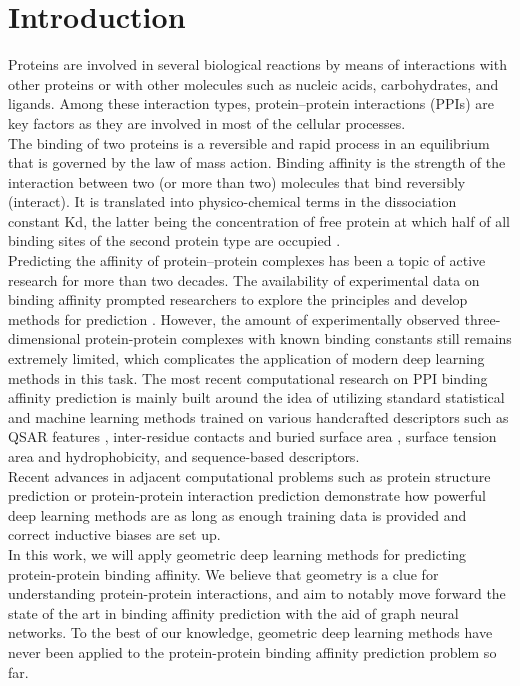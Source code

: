 \section{Introduction}
Proteins are involved in several biological reactions by means of interactions with other proteins or
with other molecules such as nucleic acids, carbohydrates, and ligands. Among these interaction
types, protein–protein interactions (PPIs) are key factors as they are
involved in most of the cellular processes. \\
The binding of two proteins is a reversible and rapid process in an equilibrium that is
governed by the law of mass action. Binding affinity is the strength of the interaction between two
(or more than two) molecules that bind reversibly (interact). It is translated into physico-chemical
terms in the dissociation constant Kd, the latter being the concentration of free protein at which
half of all binding sites of the second protein type are occupied \cite{Kastritis}. \\
Predicting the affinity of protein–protein complexes has been a topic of active research for more
than two decades. The availability of experimental data on binding affinity prompted researchers to
explore the principles and develop methods for prediction \cite{Gromiha}. However, the amount of experimentally
observed three-dimensional protein-protein complexes with known binding constants still remains
extremely limited, which complicates the application of modern deep learning methods in this
task. The most recent computational research on PPI binding affinity prediction is mainly built
around the idea of utilizing standard statistical and machine learning methods
trained on various handcrafted descriptors such as QSAR features \cite{Yang}, inter-residue contacts and
buried surface area , surface tension area and hydrophobicity, and sequence-based descriptors. \\
Recent advances in adjacent computational problems such as protein structure prediction or
protein-protein interaction prediction demonstrate how powerful deep learning methods are as long as enough training data is provided and correct inductive biases are set up. \\
In this work, we will apply geometric deep learning methods for predicting protein-protein binding
affinity. We believe that geometry is a clue for understanding protein-protein interactions, and aim
to notably move forward the state of the art in binding affinity prediction with the aid of graph
neural networks. To the best of our knowledge, geometric deep learning methods have never been
applied to the protein-protein binding affinity prediction problem so far.
